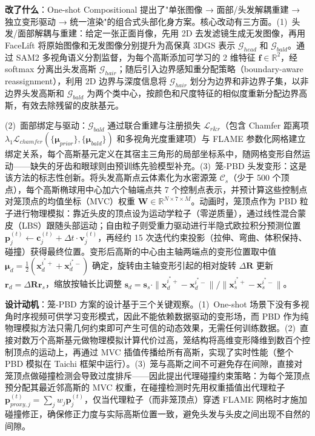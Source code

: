 \textbf{改了什么}：One-shot Compositional 提出了"单张图像 → 面部/头发解耦重建 → 独立变形驱动 → 统一渲染"的组合式头部化身方案。核心改动有三方面。(1)~头发/面部解耦与重建：给定一张正面肖像，先用 2D 去发滤镜生成无发图像，再用 FaceLift 将原始图像和无发图像分别提升为高保真 3DGS 表示 $\mathcal{G}_{head}$ 和 $\mathcal{G}_{bald}$。通过 SAM2 多视角语义分割监督，为每个高斯添加可学习的 2 维特征 $\mathbf{f} \in \mathbb{R}^2$，经 softmax 分离出头发高斯 $\mathcal{G}_{hair}$；随后引入边界感知重分配策略（boundary-aware reassignment），利用 2D 边界与深度信息将 $\mathcal{G}_{hair}$ 划分为边界和非边界子集，以非边界头发高斯和 $\mathcal{G}_{bald}$ 为两个类中心，按颜色和尺度特征的相似度重新分配边界高斯，有效去除残留的皮肤基元。

(2)~面部绑定与驱动：$\mathcal{G}_{bald}$ 通过联合重建与注册损失 $\mathcal{L}_{r\&r}$（包含 Chamfer 距离项 $\lambda_1 \mathcal{L}_{chamfer}(\{\boldsymbol{\mu}_{prior}\}, \{\boldsymbol{\mu}_{bald}\})$ 和多视角光度重建项）与 FLAME 参数化网格建立绑定关系，每个高斯基元定义在其宿主三角形的局部坐标系中，随网格变形自然运动——缺失的牙齿和眼球则由预训练先验模型补充。(3)~笼-PBD 头发变形：这是该方法的标志性创新。将头发高斯点云体素化为水密源笼 $\mathcal{C}_s$（少于 500 个顶点），每个高斯椭球用中心加六个轴端点共 7 个控制点表示，并预计算这些控制点对笼顶点的均值坐标（MVC）权重 $\mathbf{W} \in \mathbb{R}^{N \times 7 \times M}$。动画时，笼顶点作为 PBD 粒子进行物理模拟：靠近头皮的顶点设为运动学粒子（零逆质量），通过线性混合蒙皮（LBS）跟随头部运动；自由粒子则受重力驱动进行半隐式欧拉积分预测位置 $\mathbf{p}_j^{(t)} \leftarrow \mathbf{c}_j^{(t)} + \Delta t \cdot \mathbf{v}_j^{(t)}$，再经约 15 次迭代约束投影（拉伸、弯曲、体积保持、碰撞）获得最终位置。变形后高斯的中心由主轴两端点的变形位置取中值 $\boldsymbol{\mu}_d = \frac{1}{2}(\mathbf{x}_d^{i^*+} + \mathbf{x}_d^{i^*-})$ 确定，旋转由主轴变形引起的相对旋转 $\Delta\mathbf{R}$ 更新 $\mathbf{r}_d = \Delta\mathbf{R} \mathbf{r}_s$，缩放按轴长比调整 $\mathbf{s}_d = \mathbf{s}_s \cdot \|\mathbf{x}_d^{i^*+} - \mathbf{x}_d^{i^*-}\| / \|\mathbf{x}_s^{i^*+} - \mathbf{x}_s^{i^*-}\|$。

\textbf{设计动机}：笼-PBD 方案的设计基于三个关键观察。(1)~One-shot 场景下没有多视角时序视频可供学习变形模式，因此不能依赖数据驱动的变形场，而 PBD 作为纯物理模拟方法只需几何约束即可产生可信的动态效果，无需任何训练数据。(2)~直接对数万个高斯基元做物理模拟计算代价过高，笼结构将高维变形降维到数百个控制顶点的运动上，再通过 MVC 插值传播给所有高斯，实现了实时性能（整个 PBD 模拟在 Taichi 框架中运行）。(3)~笼与高斯之间不可避免存在间隙，直接对笼顶点做碰撞检测会导致过度排斥——因此提出代理碰撞约束策略：为每个笼顶点预分配其最近邻高斯的 MVC 权重，在碰撞检测时先用权重插值出代理粒子 $\mathbf{p}_{proxy,j}^{(t)} = \sum_j w_j \mathbf{p}_j^{(t)}$，仅当代理粒子（而非笼顶点）穿透 FLAME 网格时才施加碰撞修正，确保修正力度与实际高斯位置一致，避免头发与头皮之间出现不自然的间隙。

